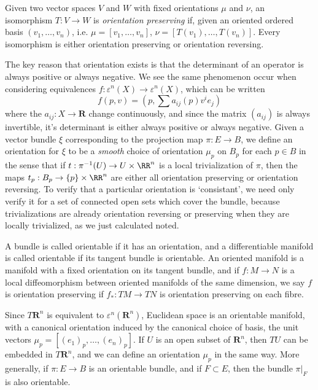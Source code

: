 Given two vector spaces $V$ and $W$ with fixed orientations $\mu$ and $\nu$, an isomorphism $T: V \to W$ is \emph{orientation preserving} if, given an oriented ordered basis $(v_1, \dots, v_n)$, i.e. $\mu = [v_1, \dots, v_n]$, $\nu = [T(v_1), \dots, T(v_n)]$. Every isomorphism is either orientation preserving or orientation reversing.

The key reason that orientation exists is that the determinant of an operator is always positive or always negative. We see the same phenomenon occur when considering equivalences $f: \varepsilon^n(X) \to \varepsilon^n(X)$, which can be written
%
\[ f(p,v) = \left(p, \sum a_{ij}(p) v^i e_j \right) \]
%
where the $a_{ij}: X \to \mathbf{R}$ change continuously, and since the matrix $(a_{ij})$ is always invertible, it's determinant is either always positive or always negative. Given a vector bundle $\xi$ corresponding to the projection map $\pi: E \to B$, we define an orientation for $\xi$ to be a \emph{smooth} choice of orientation $\mu_p$ on $B_p$ for each $p \in B$ in the sense that if $t: \pi^{-1}(U) \to U \times \RR^n$ is a local trivialization of $\pi$, then the maps $t_p: B_p \to \{ p \} \times \RR^n$ are either all orientation preserving or orientation reversing. To verify that a particular orientation is `consistant', we need only verify it for a set of connected open sets which cover the bundle, because trivializations are already orientation reversing or preserving when they are locally trivialized, as we just calculated noted.

A bundle is called orientable if it has an orientation, and a differentiable manifold is called orientable if its tangent bundle is orientable. An oriented manifold is a manifold with a fixed orientation on its tangent bundle, and if $f: M \to N$ is a local diffeomorphism between oriented manifolds of the same dimension, we say $f$ is orientation preserving if $f_*: TM \to TN$ is orientation preserving on each fibre.

\begin{example}
Since $T\mathbf{R}^n$ is equivalent to $\varepsilon^n(\mathbf{R}^n)$, Euclidean space is an orientable manifold, with a canonical orientation induced by the canonical choice of basis, the unit vectors $\mu_p = [(e_1)_p, \dots, (e_n)_p]$. If $U$ is an open subset of $\mathbf{R}^n$, then $TU$ can be embedded in $T\mathbf{R}^n$, and we can define an orientation $\mu_p$ in the same way. More generally, if $\pi: E \to B$ is an orientable bundle, and if $F \subset E$, then the bundle $\pi|_F$ is also orientable.
\end{example}

